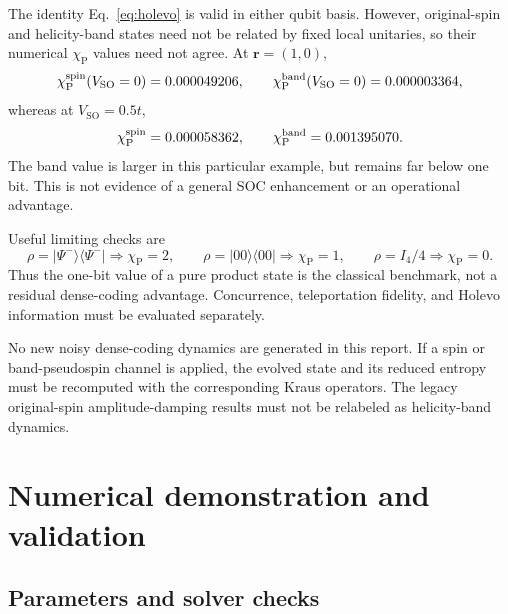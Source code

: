 \documentclass[11pt]{article}
\newcommand{\SO}{V_{\mathrm{SO}}}
\newcommand{\rr}{\mathbf r}
\begin{document}
The identity Eq.~\eqref{eq:holevo} is valid in either qubit basis. However, original-spin and helicity-band states need not be related by fixed local unitaries, so their numerical $\chi_{\mathrm P}$ values need not agree. At $\rr=(1,0)$,
\begin{equation}
\chi_{\mathrm P}^{\mathrm{spin}}(\SO=0)=\SpinChiZero,\qquad
\chi_{\mathrm P}^{\mathrm{band}}(\SO=0)=\BandChiZero,
\end{equation}
whereas at $\SO=0.5t$,
\begin{equation}
\chi_{\mathrm P}^{\mathrm{spin}}=0.000058362,\qquad
\chi_{\mathrm P}^{\mathrm{band}}=0.001395070.
\end{equation}
The band value is larger in this particular example, but remains far below one bit. This is not evidence of a general SOC enhancement or an operational advantage.

Useful limiting checks are
\begin{equation}
\rho=|\Psi^-\rangle\langle\Psi^-|\Rightarrow\chi_{\mathrm P}=2,
\qquad
\rho=|00\rangle\langle00|\Rightarrow\chi_{\mathrm P}=1,
\qquad
\rho=I_4/4\Rightarrow\chi_{\mathrm P}=0.
\end{equation}
Thus the one-bit value of a pure product state is the classical benchmark, not a residual dense-coding advantage. Concurrence, teleportation fidelity, and Holevo information must be evaluated separately.

No new noisy dense-coding dynamics are generated in this report. If a spin or band-pseudospin channel is applied, the evolved state and its reduced entropy must be recomputed with the corresponding Kraus operators. The legacy original-spin amplitude-damping results must not be relabeled as helicity-band dynamics.

\section{Numerical demonstration and validation}
\label{sec:numerics}

\subsection{Parameters and solver checks}
\end{document}
